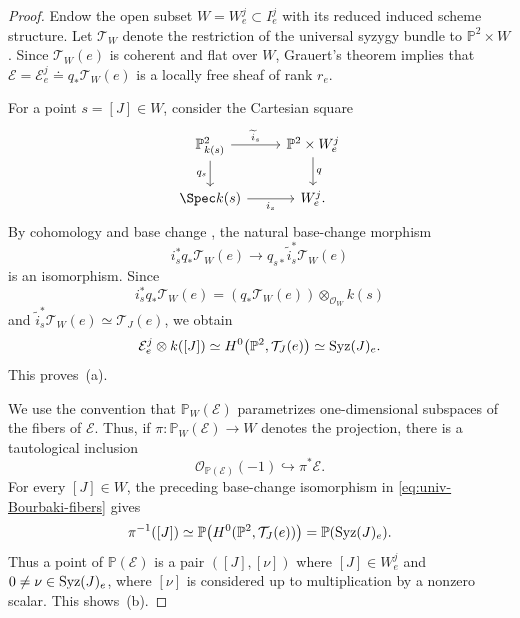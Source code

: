 \documentclass[11pt]{amsart} %
\theoremstyle{definition}
\def\syz{\mbox{\rm Syz}}
\def\NZQ{\mathbb}               %
\def\PP{{\NZQ P}}
\def\T{{\mathcal T}}
\begin{document}
\begin{proof}
Endow the open subset $W = W_e^j \subset I_e^j$ with its reduced
induced scheme structure. Let $\T_W$ denote the restriction of the
universal syzygy bundle to $\PP^2\times W$. Since $\T_W(e)$ is
coherent and flat over $W$, Grauert's theorem
\cite[Chapter~III, Corollary~12.9]{hartshorne2013algebraic}
implies that \(
\mathcal E = \mathcal{E}_e^j \doteq q_*\T_W(e) \)
is a locally free sheaf of rank $r_e$. 

For a point $s=[J]\in W$, consider the Cartesian square
\[
\begin{tikzcd}
\PP^2_{k(s)}
\arrow[r,"\widetilde{i}_s"]
\arrow[d,"q_s"']
&
\PP^2\times W_e^j
\arrow[d,"q"]
\\
\Spec k(s)
\arrow[r,"i_s"']
&
W_e^j .
\end{tikzcd}
\]
By cohomology and base change
\cite[Chapter~III, Corollary~12.9 and Theorem~12.11]{hartshorne2013algebraic}, the natural base-change morphism
\[
i_s^*q_*\T_W(e)
\longrightarrow
q_{s*}\widetilde{i}_s^*\T_W(e)
\]
is an isomorphism. Since
\[
i_s^*q_*\T_W(e)
=
(q_*\T_W(e))\otimes_{\mathcal O_W}k(s)
\]
and \(\widetilde{i}_s^*\T_W(e)
\simeq
\T_J(e)\),
we obtain
\begin{equation}\label{eq:univ-Bourbaki-fibers}
\mathcal E_e^j\otimes k([J])
\simeq
H^0\bigl(\PP^2,\T_J(e)\bigr)
\simeq
\syz(J)_e.
\end{equation}
This proves~(a).

We use the convention that
\(\PP_W(\mathcal E)\) parametrizes one-dimensional subspaces of the fibers of $\mathcal E$. Thus, if \(
\pi:\PP_W(\mathcal E)\longrightarrow W
\) denotes the projection, there is a tautological inclusion
\[
\mathcal O_{\PP(\mathcal E)}(-1)
\hookrightarrow
\pi^*\mathcal E.
\]
For every $[J]\in W$, the preceding base-change isomorphism in \eqref{eq:univ-Bourbaki-fibers} gives
\[
\pi^{-1}([J])
\simeq
\PP\bigl(
H^0(\PP^2,\T_J(e))
\bigr)
=
\PP(\syz(J)_e).
\]
Thus a point of $\PP(\mathcal E)$ is a pair \(([J],[\nu])\) where \([J] \in W_{e}^j\) and \(0\neq\nu\in\syz(J)_e\),
where $[\nu]$ is considered up to multiplication by a nonzero scalar. This shows~(b).


\end{proof}
\end{document}
